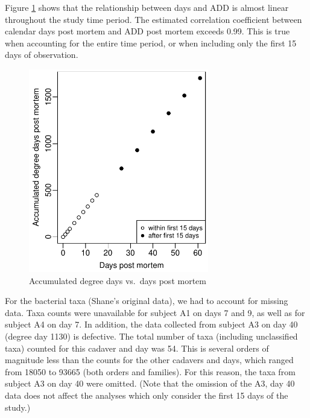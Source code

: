 \documentclass{article}
\begin{document}
Figure \ref{fig:degdays_vs_days} shows that the relationship between
days and ADD is almost linear throughout the study time period.  The
estimated correlation coefficient between calendar days post mortem
and ADD post mortem exceeds 0.99.  This is true when accounting for
the entire time period, or when including only the first 15 days of
observation.
\begin{figure}[hb]
  \centering
  \includegraphics[height=3.5in]{degdays_vs_days}
  \caption{Accumulated degree days vs.~days post mortem}
  \label{fig:degdays_vs_days}
\end{figure}

For the bacterial taxa (Shane's original data), we had to account for
missing data.  Taxa counts were unavailable for subject A1 on days 7
and 9, as well as for subject A4 on day 7.  In addition, the data
collected from subject A3 on day 40 (degree day 1130) is defective.
The total number of taxa (including unclassified taxa) counted for
this cadaver and day was 54.  This is several orders of magnitude less
than the counts for the other cadavers and days, which ranged from
18050 to 93665 (both orders and families).  For this reason, the taxa
from subject A3 on day 40 were omitted.  (Note that the omission of
the A3, day 40 data does not affect the analyses which only consider
the first 15 days of the study.)
\end{document}

